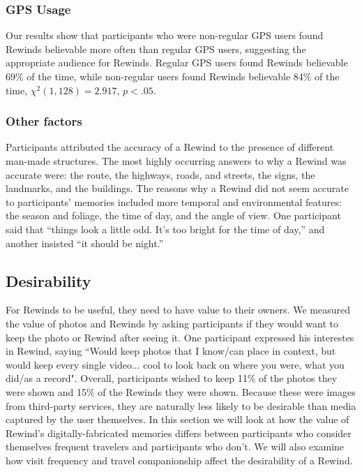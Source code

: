 \documentclass{sigchi}
\begin{document}
\subsubsection{GPS Usage}
Our results show that participants who were non-regular GPS users found Rewinds believable more often than regular GPS users, suggesting the appropriate audience for Rewinds. Regular GPS users found Rewinds believable 69\% of the time, while non-regular users found Rewinds believable 84\% of the time, $\chi^2(1, 128) = 2.917$, $p < .05$.

\subsubsection{Other factors}
Participants attributed the accuracy of a Rewind to the presence of different man-made structures. The most highly occurring answers to why a Rewind was accurate were: the route, the highways, roads, and streets, the signs, the landmarks, and the buildings. The reasons why a Rewind did not seem accurate to participants' memories included more temporal and environmental features: the season and foliage, the time of day, and the angle of view. One participant said that ``things look a little odd. It's too bright for the time of day,'' and another insisted ``it should be night.''


\subsection{Desirability}
For Rewinds to be useful, they need to have value to their owners. We measured the value of photos and Rewinds by asking participants if they would want to keep the photo or Rewind after seeing it. One participant expressed his interestes in Rewind, saying ``Would keep photos that I know/can place in context, but would keep every single video... cool to look back on where you were, what you did/as a record". Overall, participants wished to keep 11\% of the photos they were shown and 15\% of the Rewinds they were shown. Because these were images from third-party services, they are naturally less likely to be desirable than media captured by the user themselves. In this section we will look at how the value of Rewind's digitally-fabricated memories differs between participants who consider themselves frequent travelers and participants who don't. We will also examine how visit frequency and travel companionship affect the desirability of a Rewind.
\end{document}
